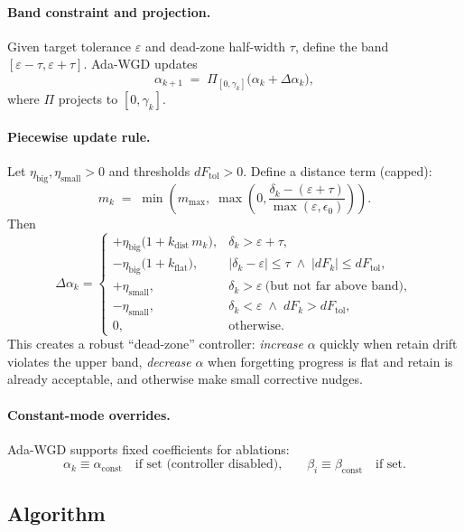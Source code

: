   \paragraph{Band constraint and projection.}
  Given target tolerance $\varepsilon$ and dead-zone half-width $\tau$, define the band
  $[\varepsilon-\tau,\varepsilon+\tau]$.
  Ada-WGD updates
  \[
  \alpha_{k+1}
  \;=\;
  \Pi_{[0,\gamma_k]}\Big(\alpha_k + \Delta\alpha_k\Big),
  \]
  where $\Pi$ projects to $[0,\gamma_k]$.

  \paragraph{Piecewise update rule.}
  Let $\eta_{\mathrm{big}},\eta_{\mathrm{small}}>0$ and thresholds $dF_{\mathrm{tol}}>0$.
  Define a distance term (capped):
  \[
  m_k
  \;=\;
  \min\!\left(
  m_{\max},\;
  \max\!\left(0,\frac{\delta_k-(\varepsilon+\tau)}{\max(\varepsilon,\epsilon_0)}\right)
  \right).
  \]
  Then
  \[
  \Delta\alpha_k=
  \begin{cases}
  +\eta_{\mathrm{big}}\big(1+k_{\mathrm{dist}}\,m_k\big),
  & \delta_k>\varepsilon+\tau,\\[4pt]
  -\eta_{\mathrm{big}}\big(1+k_{\mathrm{flat}}\big),
  & |\delta_k-\varepsilon|\le\tau \;\land\; |dF_k|\le dF_{\mathrm{tol}},\\[4pt]
  +\eta_{\mathrm{small}},
  & \delta_k>\varepsilon \ \text{(but not far above band)},\\[4pt]
  -\eta_{\mathrm{small}},
  & \delta_k<\varepsilon \;\land\; dF_k>dF_{\mathrm{tol}},\\[4pt]
  0,
  & \text{otherwise}.
  \end{cases}
  \]
  This creates a robust ``dead-zone'' controller:
  \emph{increase} $\alpha$ quickly when retain drift violates the upper band,
  \emph{decrease} $\alpha$ when forgetting progress is flat and retain is already acceptable,
  and otherwise make small corrective nudges.

  \paragraph{Constant-mode overrides.}
  Ada-WGD supports fixed coefficients for ablations:
  \[
  \alpha_k \equiv \alpha_{\mathrm{const}} \quad \text{if set (controller disabled),}
  \qquad
  \beta_i \equiv \beta_{\mathrm{const}} \quad \text{if set.}
  \]

  \subsection{Algorithm}

